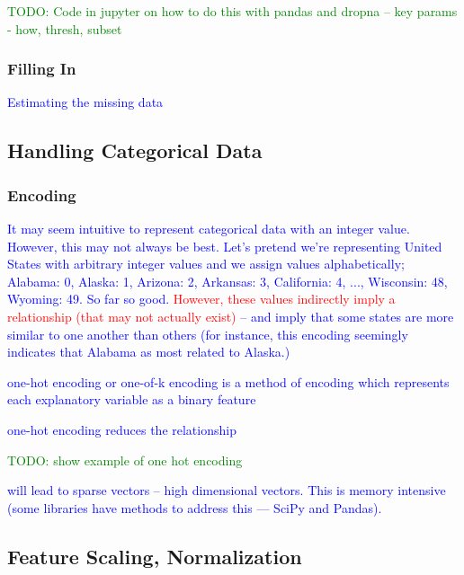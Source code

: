 \textcolor{green}{TODO: Code in jupyter on how to do this with pandas and dropna -- key params - how, thresh, subset}

\subsubsection{Filling In}

\textcolor{blue}{Estimating the missing data}

\subsection{Handling Categorical Data}

\subsubsection{Encoding}

\textcolor{blue}{It may seem intuitive to represent categorical data with an integer value. However, this may not always be best. Let's pretend we're representing United States with arbitrary integer values and we assign values alphabetically; Alabama: 0, Alaska: 1, Arizona: 2, Arkansas: 3, California: 4, ..., Wisconsin: 48, Wyoming: 49. So far so good. \textcolor{red}{However, these values indirectly imply a relationship (that may not actually exist)} -- and imply that some states are more similar to one another than others (for instance, this encoding seemingly indicates that Alabama as most related to Alaska.) }

\textcolor{blue}{{one-hot encoding} or one-of-k encoding is a method of encoding which represents each explanatory variable as a binary feature}

\textcolor{blue}{one-hot encoding reduces the relationship}

\textcolor{green}{TODO: show example of one hot encoding}

\textcolor{blue}{will lead to {sparse vectors} -- high dimensional vectors. This is memory intensive (some libraries have methods to address this --- SciPy and Pandas).}

\subsection{Feature Scaling, Normalization}


